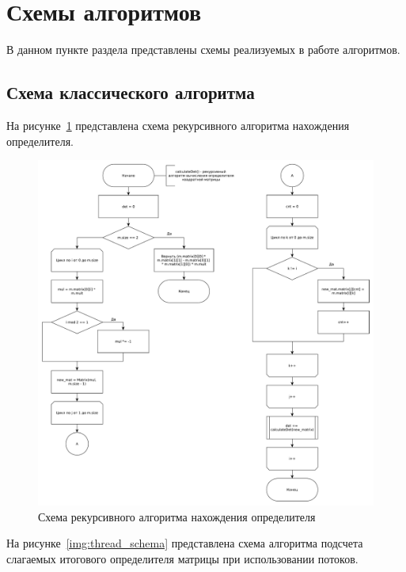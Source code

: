 \documentclass[12pt]{report}
\begin{document}
    \section{Схемы алгоритмов}
    В данном пункте раздела представлены схемы реализуемых в работе алгоритмов.

    \subsection{Схема классического алгоритма}
    На рисунке~\ref{img:count_det} представлена схема рекурсивного алгоритма нахождения определителя.

    \begin{figure}[H]
        \centering
        \includegraphics[width=1\linewidth]{img/count_det}
        \caption{
            Схема рекурсивного алгоритма нахождения определителя
        }
        \label{img:count_det}
    \end{figure}

    На рисунке~\ref{img:thread_schema} представлена схема алгоритма подсчета слагаемых итогового определителя матрицы
    при использовании потоков.
\end{document}
